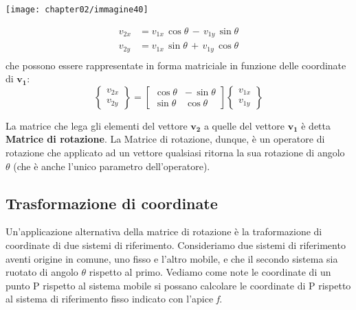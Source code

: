 			\vspace{2mm}
			\begin{minipage}{.5\textwidth}
				\centering
				\texttt{[image: chapter02/immagine40]}
			\end{minipage}
			\hfill
			\begin{minipage}{.5\textwidth}
				\begin{equation*}
					\begin{split}
						v_{2x} &= v_{1x} \, \cos{\theta} \,- \, v_{1y} \, \sin{\theta}\\
						v_{2y} &= v_{1x} \, \sin{\theta} \,+ \, v_{1y} \, \cos{\theta}\\
					\end{split}
				\end{equation*}
				che possono essere rappresentate in forma matriciale in funzione delle coordinate di $\mathbf{v_1}$:
				\begin{equation*}
					\begin{Bmatrix}
						v_{2x}\\
						v_{2y}
					\end{Bmatrix}
					= 
					\begin{bmatrix}
					\cos{\theta} & -\,\sin{\theta}\\
					\sin{\theta} &  \cos{\theta}
					\end{bmatrix}
					\begin{Bmatrix}
						v_{1x}\\
						v_{1y}
					\end{Bmatrix}
				\end{equation*}
			\end{minipage}

\vspace{4mm}
		La matrice che lega gli elementi del vettore $\mathbf{v_2}$ a quelle del vettore $\mathbf{v_1}$ è detta \textbf{Matrice di rotazione}. La Matrice di rotazione, dunque, è un operatore di rotazione che applicato ad un vettore qualsiasi ritorna la sua rotazione di angolo $\theta$ (che è anche l'unico parametro dell'operatore).

		\subsection{Trasformazione di coordinate}
			Un'applicazione alternativa della matrice di rotazione è la traformazione di coordinate di due sistemi di riferimento.
			Consideriamo due sistemi di riferimento aventi origine in comune, uno fisso e l'altro mobile, e che il secondo sistema sia ruotato di angolo $\theta$ rispetto al primo.\newline
			Vediamo come note le coordinate di un punto P rispetto al sistema mobile si possano calcolare le coordinate di P rispetto al sistema di riferimento fisso indicato con l'apice \emph{f}.
					
